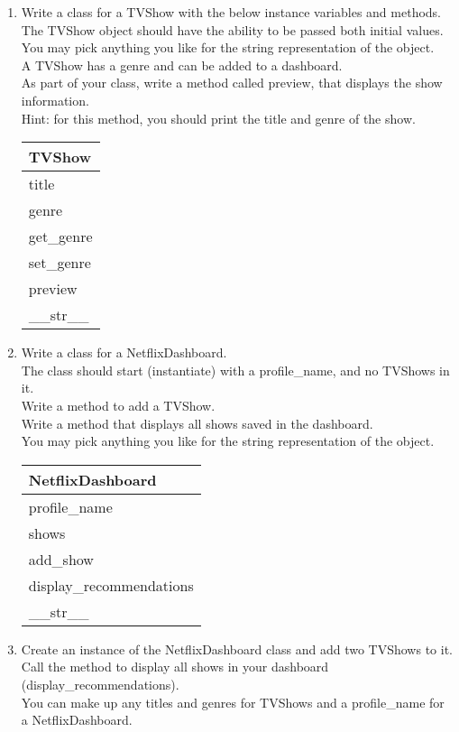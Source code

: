	\item
	\begin{enumerate}
		\item
			Write a class for a TVShow with the below instance variables and methods.\\ 
			The TVShow object should have the ability to be passed both initial values.\\  
			You may pick anything you like for the string representation of the object.\\
			A TVShow has a genre and can be added to a dashboard.\\  
			As part of your class, write a method called preview, that displays the show information.\\
			Hint: for this method, you should print the title and genre of the show.
			\begin{flushright}
			\begin{tabular}{|l|}
				\hline
				TVShow\\ \hline
				title \\	genre\\	 \hline
				get\_genre \\ set\_genre \\ preview \\ \_\_str\_\_ \\ \hline
			\end{tabular}
			\end{flushright}

		\item
			Write a class for a NetflixDashboard. \\
			The class should start (instantiate) with a profile\_name, and no TVShows in it. \\ 
			Write a method to add a TVShow.\\
			Write a method that displays all shows saved in the dashboard.\\
			You may pick anything you like for the string representation of the object.
	
			\begin{flushright}
			\begin{tabular}{|l|}
				\hline
				NetflixDashboard\\ \hline  	%
				profile\_name \\ shows\\ \hline		%
				add\_show \\ display\_recommendations \\ \_\_str\_\_ \\ \hline		%
			\end{tabular}
			\end{flushright}

		\item
			Create an instance of the NetflixDashboard class and add two TVShows to it.\\
			Call the method to display all shows in your dashboard (display\_recommendations).\\
			You can make up any titles and genres for TVShows and a profile\_name for a NetflixDashboard.\\
	\end{enumerate}
\pagebreak







